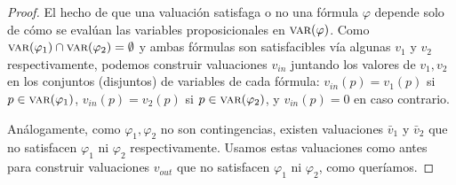 \begin{proof}
El hecho de que una valuación satisfaga o no una fórmula $\varphi$ depende solo de cómo se evalúan las variables proposicionales en $\textsc{var}(\varphi)$. Como $\textsc{var}(\varphi_1) \cap  \textsc{var}(\varphi_2) = \emptyset$ y ambas fórmulas son satisfacibles vía algunas $v_1$ y $v_2$ respectivamente, podemos construir valuaciones $v_{in}$ juntando los valores de $v_1, v_2$ en los conjuntos (disjuntos) de variables de cada fórmula: $v_{in}(p) = v_1(p)$ si $p \in \textsc{var}(\varphi_1)$,  $v_{in}(p) = v_2(p)$ si $p \in \textsc{var}(\varphi_2)$, y $v_{in}(p) = 0$ en caso contrario. 

Análogamente, como $\varphi_1, \varphi_2$  no son contingencias, existen valuaciones $\bar{v}_1$ y $\bar{v}_2$ que no satisfacen $\varphi_1$ ni $\varphi_2$ respectivamente. Usamos estas valuaciones como antes para construir valuaciones $v_{out}$ que no satisfacen $\varphi_1$ ni $\varphi_2$, como queríamos.
\end{proof}


